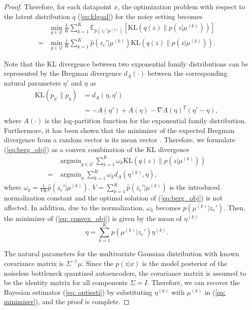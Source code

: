 \documentclass[letterpaper]{article} %
\DeclareMathOperator*{\argmin}{arg\min}
\begin{document}
\begin{proof}
Therefore, for each datapoint $x$, the optimization problem with respect to the latent distribution $q$ (\ref{eq:klgoal}) for the noisy setting becomes
\begin{align}
\label{eq:berg_obj}
&\min_{q \in \mathcal{Q}}\frac{1}{K}\sum_{k = 1}^K\mathbb{E}_{\hat{p}\left(z_e'|\mu^{(k)}\right)}\left[\text{KL}\left(q(z)\|p\left(z|\mu^{(k)}\right)\right)\right]\\
=& \min_{q \in \mathcal{Q}}\frac{1}{K}\sum_{k = 1}^K \hat{p}\left(z_e'|\mu^{(k)}\right)\text{KL}\left(q(z)\|p\left(z|\mu^{(k)}\right)\right).
\end{align}

Note that the KL divergence between two exponential family distributions can be represented by the Bregman divergence $d_A(\cdot)$ between the corresponding natural parameters $\eta'$ and $\eta$ as
\begin{align}
\text{KL}(p_{\eta'}\|p_{\eta}) &=  d_A(\eta, \eta')\\
&=-A(\eta')+A(\eta)-\nabla A(\eta)^T(\eta'-\eta) ,
\end{align}
where $A(\cdot)$ is the log-partition function for the exponential family distribution. Furthermore, it has been shown that the minimizer of the expected Bregman divergence from a random vector is its mean vector \cite{bregman}. Therefore, we formulate (\ref{eq:berg_obj}) as a convex combination of the KL divergence
\begin{align}
\label{eq: convex_obj}
&\argmin_{q \in \mathcal{Q}} \sum_{k = 1}^ K\omega_k \text{KL}\left(q(z)\| p\left(z|\mu^{(k)}\right)\right) \\
=&\argmin_{\eta}\sum_{k = 1}^K \omega_k d_A(\eta^{(k)}, \eta),
\end{align}
where $\omega_k = \frac{1}{VK}\hat{p}\left(z_e'|\mu^{(k)}\right)$. $V = \sum_{k = 1}^K\hat{p}\left(z_e'|\mu^{(k)}\right)$ is the introduced normalization constant and the optimal solution of (\ref{eq:berg_obj}) is not affected. In addition, due to the normalization, $\omega_k$ becomes $p\left(\mu^{(k)}|z_e'\right)$. Then, the minimizer of (\ref{eq: convex_obj}) is given by the mean of $\eta^{(k)}$
\begin{equation}
\label{eq: minimizer}
\eta =\sum_{k = 1}^{K}p\left(\mu^{(k)}|z_e'\right)\eta^{(k)}.
\end{equation}

The natural parameters for the multivariate Gaussian distribution with known covariance matrix is $\Sigma^{-1}\mu$. Since the $p(z|x)$ is the model posterior of the noiseless bottleneck quantized autoencoders, the covariance matrix is assumed to be the identity matrix for all components $\Sigma = I$. Therefore, we can recover the Bayesian estimator (\ref{eq: optiesti}) by substituting $\eta^{(k)}$ with $\mu^{(k)}$ in (\ref{eq: minimizer}), and the proof is complete.
\end{proof}
\end{document}
